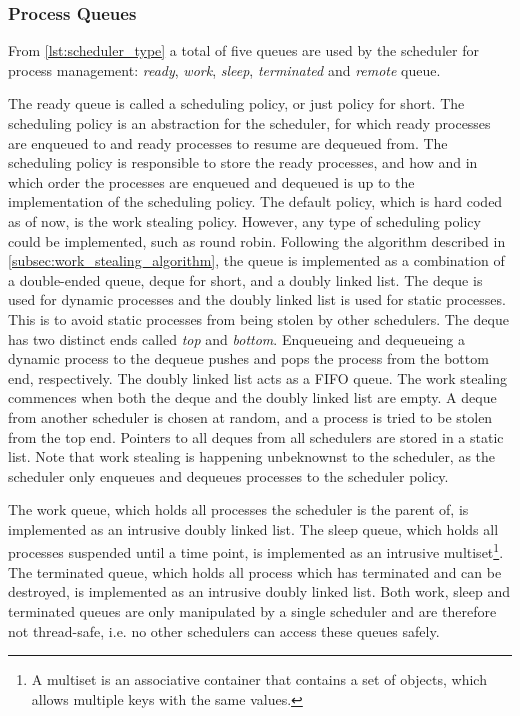 \subsubsection{Process Queues}


From \cref{lst:scheduler_type} a total of five queues are used by the scheduler for process management: \textit{ready}, \textit{work}, \textit{sleep}, \textit{terminated} and \textit{remote} queue. 

The ready queue is called a scheduling policy, or just policy for short. The scheduling policy is an abstraction for the scheduler, for which ready processes are enqueued to and ready processes to resume are dequeued from. The scheduling policy is responsible to store the ready processes, and how and in which order the processes are enqueued and dequeued is up to the implementation of the scheduling policy. The default policy, which is hard coded as of now, is the work stealing policy. However, any type of scheduling policy could be implemented, such as round robin. Following the algorithm described in \cref{subsec:work_stealing_algorithm}, the queue is implemented as a combination of a double\hyp{}ended queue, deque for short, and a doubly linked list. The deque is used for dynamic processes and the doubly linked list is used for static processes. This is to avoid static processes from being stolen by other schedulers. The deque has two distinct ends called \textit{top} and \textit{bottom}. Enqueueing and dequeueing a dynamic process to the dequeue pushes and pops the process from the bottom end, respectively. The doubly linked list acts as a FIFO queue. The work stealing commences when both the deque and the doubly linked list are empty. A deque from another scheduler is chosen at random, and a process is tried to be stolen from the top end. Pointers to all deques from all schedulers are stored in a static list. Note that work stealing is happening unbeknownst to the scheduler, as the scheduler only enqueues and dequeues processes to the scheduler policy. 

The work queue, which holds all processes the scheduler is the parent of, is implemented as an intrusive doubly linked list. The sleep queue, which holds all processes suspended until a time point, is implemented as an intrusive multiset\footnote{A multiset is an associative container that contains a set of objects, which allows multiple keys with the same values.}. The terminated queue, which holds all process which has terminated and can be destroyed, is implemented as an intrusive doubly linked list. Both work, sleep and terminated queues are only manipulated by a single scheduler and are therefore not thread\hyp{}safe, i.e. no other schedulers can access these queues safely.

